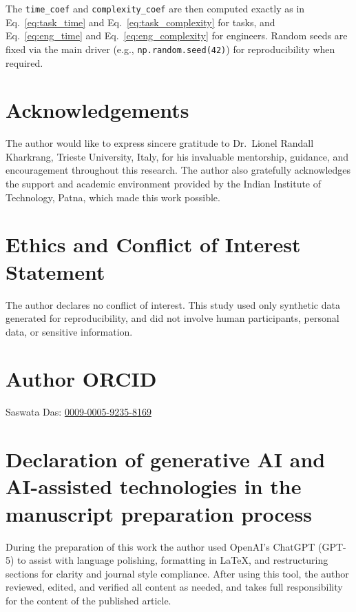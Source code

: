 \documentclass[final,1p,times]{elsarticle}
\begin{document}
The \texttt{time\_coef} and \texttt{complexity\_coef} are then computed exactly as in
Eq.~\ref{eq:task_time} and Eq.~\ref{eq:task_complexity} for tasks,
and Eq.~\ref{eq:eng_time} and Eq.~\ref{eq:eng_complexity} for engineers.
Random seeds are fixed via the main driver (e.g., \texttt{np.random.seed(42)}) for reproducibility when required.

\section*{Acknowledgements}
The author would like to express sincere gratitude to 
Dr.~Lionel Randall Kharkrang, Trieste University, Italy, 
for his invaluable mentorship, guidance, and encouragement throughout this research. 
The author also gratefully acknowledges the support and academic environment provided by the 
Indian Institute of Technology, Patna, which made this work possible.

\section*{Ethics and Conflict of Interest Statement}
The author declares no conflict of interest. 
This study used only synthetic data generated for reproducibility, 
and did not involve human participants, personal data, or sensitive information.

\section*{Author ORCID}
Saswata Das: \href{https://orcid.org/0009-0005-9235-8169}{0009-0005-9235-8169}

\section*{Declaration of generative AI and AI-assisted technologies in the manuscript preparation process}

During the preparation of this work the author used OpenAI's ChatGPT (GPT-5) to assist with language polishing, formatting in LaTeX, and restructuring sections for clarity and journal style compliance. After using this tool, the author reviewed, edited, and verified all content as needed, and takes full responsibility for the content of the published article.
\end{document}
